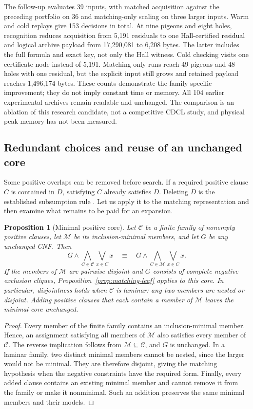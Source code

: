 \documentclass[11pt,a4paper]{article}
\numberwithin{equation}{section}
\theoremstyle{plain}
\newtheorem{proposition}[lemma]{Proposition}
\theoremstyle{definition}
\theoremstyle{remark}
\begin{document}
The follow-up evaluates 39 inputs, with matched acquisition against the preceding portfolio on 36 and matching-only scaling on three larger inputs. Warm and cold replays give 153 decisions in total. At nine pigeons and eight holes, recognition reduces acquisition from 5,191 residuals to one Hall-certified residual and logical archive payload from 17,290,081 to 6,208 bytes. The latter includes the full formula and exact key, not only the Hall witness. Cold checking visits one certificate node instead of 5,191. Matching-only runs reach 49 pigeons and 48 holes with one residual, but the explicit input still grows and retained payload reaches 1,496,174 bytes. These counts demonstrate the family-specific improvement; they do not imply constant time or memory. All 104 earlier experimental archives remain readable and unchanged. The comparison is an ablation of this research candidate, not a competitive CDCL study, and physical peak memory has not been measured.

\subsection{Redundant choices and reuse of an unchanged core}
\label{sec:positive-core}

Some positive overlaps can be removed before search. If a required positive clause $C$ is contained in $D$, satisfying $C$ already satisfies $D$. Deleting $D$ is the established subsumption rule \citep{eenbiere2005}. Let us apply it to the matching representation and then examine what remains to be paid for an expansion.

\begin{proposition}[Minimal positive core]
\label{prop:positive-core}
Let $\mathcal C$ be a finite family of nonempty positive clauses, let $\mathcal M$ be its inclusion-minimal members, and let $G$ be any unchanged CNF. Then
\[
G\land\bigwedge_{C\in\mathcal C}\bigvee_{x\in C}x
\quad\equiv\quad
G\land\bigwedge_{C\in\mathcal M}\bigvee_{x\in C}x.
\]
If the members of $\mathcal M$ are pairwise disjoint and $G$ consists of complete negative exclusion cliques, Proposition~\ref{prop:matching-leaf} applies to this core. In particular, disjointness holds when $\mathcal C$ is laminar: any two members are nested or disjoint. Adding positive clauses that each contain a member of $\mathcal M$ leaves the minimal core unchanged.
\end{proposition}

\begin{proof}
Every member of the finite family contains an inclusion-minimal member. Hence, an assignment satisfying all members of $\mathcal M$ also satisfies every member of $\mathcal C$. The reverse implication follows from $\mathcal M\subseteq\mathcal C$, and $G$ is unchanged. In a laminar family, two distinct minimal members cannot be nested, since the larger would not be minimal. They are therefore disjoint, giving the matching hypothesis when the negative constraints have the required form. Finally, every added clause contains an existing minimal member and cannot remove it from the family or make it nonminimal. Such an addition preserves the same minimal members and their models.
\end{proof}
\end{document}
